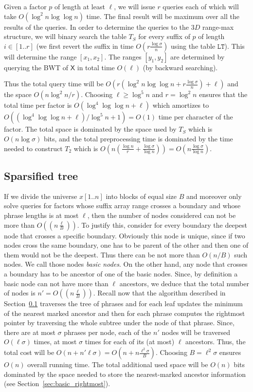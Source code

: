 \documentclass[11pt,runningheads]{llncs}
\def\X{\mathsf{X}}
\begin{document}
Given a factor $p$ of length at least $\ell$, we will 
issue $r$ queries each of which will take 
$O(\log^2n\log\log n)$ time. The final result will be maximum 
over all the results of the queries. 
In order to determine the queries 
to the $3D$ range-max structure, we will binary search 
the table $T_S$ for every suffix of $p$  of length $i\in[1..r]$
(we first revert the suffix in time $O(r\frac{\log\sigma}{n})$ 
using the table $\mathtt{LT}$). This will determine 
the range $[x_1,x_2]$. The ranges $[y_1,y_2]$ are determined by querying 
the BWT of $\X$ in total time $O(\ell)$ (by backward searching). 

Thus the total query 
time will be $O(r(\log^2n\log\log n+r\frac{\log\sigma}{n})+\ell)$ and the space $O(n\log^2n/r)$. 
Choosing $\ell\geq \log^5 n$ and $r=\log^2 n$ ensures that the total 
time per factor is $O(\log^4\log\log n+\ell)$ which amortizes to $O((\log^4\log\log n+\ell)/\log^5 n+1)=O(1)$
time per character of the factor. 
The total space is dominated by the space used by $T_S$ 
which is $O(n\log\sigma)$ bits, and the total preprocessing time is dominated by the time needed 
to construct $T_2$ which is  $O(n(\frac{\log n}{r}+\frac{\log\sigma}{\log n}))=O(n\frac{\log\sigma}{\log n})$. 


\subsection{Sparsified tree}
\label{sec:rightmost_sparse_tree}
If we divide the universe $x[1..n]$ into blocks 
of equal size $B$ and moreover only solve queries
for factors  
whose suffix array range crosses a boundary and whose phrase 
lengths is at most $\ell$, then the number of nodes considered 
can not be more than $O((n\frac{\ell}{B}))$. To justify 
this, consider for every boundary the deepest node that crosses 
a specific boundary. Obviously this node is unique, since if two nodes 
cross the same boundary, one has to be parent of the other
and then one of them would not be the deepest. 
Thus there can be not more than $O(n/B)$ such nodes. 
We call those nodes {\em basic nodes}. On the other hand, 
any node that crosses a boundary has to be ancestor of one of the basic 
nodes. Since, by definition a basic node can not have more than $\ell$ ancestors, 
we deduce that the total number of nodes is $n'=O((n\frac{\ell}{B}))$. 
Recall now that the algorithm described in Section~\ref{sec:rightmost_sparse_tree} traverses 
the tree of phrases and for each leaf updates the minimum of the nearest 
marked ancestor and then for each phrase computes the rightmost pointer 
by traversing the whole subtree under the node of that phrase. 
Since, there are at most $\sigma$ phrases per node, 
each of the $n'$ nodes will be traversed $O(\ell\sigma)$ 
times, at most $\sigma$ times for each of its (at most) $\ell$ ancestors. 
Thus, the total cost will be $O(n+n'\ell\sigma)=O(n+n\frac{\ell^2\sigma}{B})$. 
Choosing $B=\ell^2\sigma$ ensures $O(n)$ overall running time. 
The total additional used space will be $O(n)$ bits dominated by the space
needed to store the nearest-marked ancestor information (see Section~\ref{sec:basic_rightmost}). 
\end{document}
